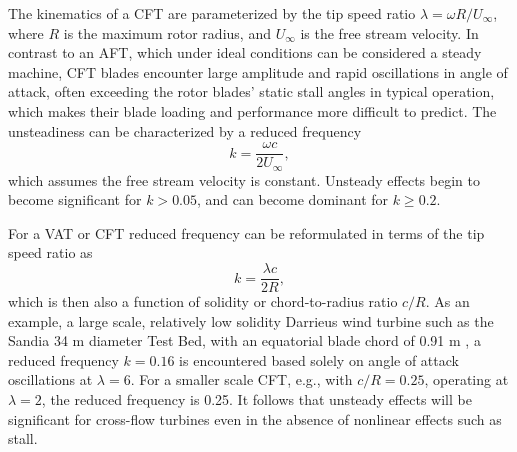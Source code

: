 \documentclass[times]{weauth}
\begin{document}
The kinematics of a CFT are parameterized by the tip speed ratio $\lambda =
\omega R/U_\infty$, where $R$ is the maximum rotor radius, and $U_\infty$ is the
free stream velocity. In contrast to an AFT, which under ideal conditions can be
considered a steady machine, CFT blades encounter large amplitude and rapid
oscillations in angle of attack, often exceeding the rotor blades' static stall
angles in typical operation, which makes their blade loading and performance
more difficult to predict. The unsteadiness can be characterized by a reduced
frequency~\cite{Leishman2006}
\begin{equation}
    k = \frac{\omega c}{2 U_\infty},
\end{equation}
which assumes the free stream velocity is constant. Unsteady effects begin to
become significant for $k > 0.05$, and can become dominant for $k \ge 0.2$.


For a VAT or CFT reduced frequency can be reformulated in terms of the tip speed
ratio as
\begin{equation}
    k = \frac{\lambda c}{2R},
\end{equation}
which is then also a function of solidity or chord-to-radius ratio $c/R$. As an
example, a large scale, relatively low solidity Darrieus wind turbine such as
the Sandia 34 m diameter Test Bed, with an equatorial blade chord of 0.91 m
\cite{Murray2011}, a reduced frequency $k=0.16$ is encountered based solely on
angle of attack oscillations at $\lambda=6$. For a smaller scale CFT, e.g., with
$c/R = 0.25$, operating at $\lambda = 2$, the reduced frequency is 0.25. It
follows that unsteady effects will be significant for cross-flow turbines even
in the absence of nonlinear effects such as stall.
\end{document}
